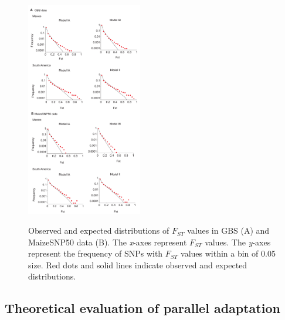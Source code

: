 \begin{figure}[tb]   
  \begin{center}
   \vspace{-0mm}
   \includegraphics[width=0.45\textwidth]{fig/Fig5}
   \renewcommand{\baselinestretch}{0.9}
   \vspace{-3mm}
   \caption{Observed and expected distributions of $F_{ST}$ values in GBS (A) and MaizeSNP50 data (B).  The \emph{x}-axes represent $F_{ST}$ values.  The \emph{y}-axes represent the frequency of SNPs with $F_{ST}$ values within a bin of 0.05 size.  Red dots and solid lines indicate observed and expected distributions. 
   }
\vspace{-6mm}
    \label{FstDist}
  \end{center}
\end{figure}


\subsection*{Theoretical evaluation of parallel adaptation }

